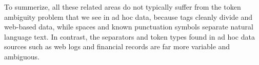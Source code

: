 To summerize, all these related areas do not typically suffer from the token ambiguity problem that 
we see in ad hoc data, because tags cleanly divide \xml{} and web-based data, 
while spaces and known punctuation symbols separate natural language text.
In contrast, the separators and token types found in ad hoc data sources such as
web logs and financial records are far more variable and ambiguous.  


